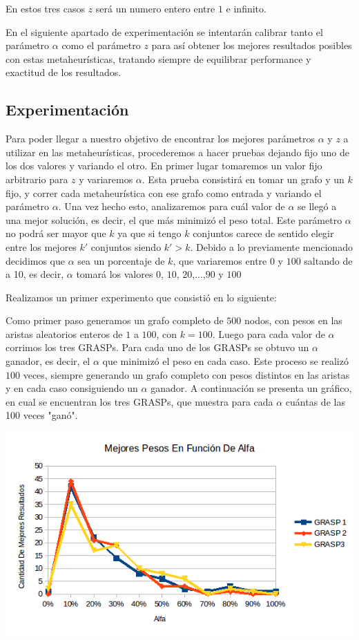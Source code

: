 En estos tres casos $z$ será un numero entero entre $1$ e infinito.

En el siguiente apartado de experimentación se intentarán calibrar tanto el parámetro $\alpha$ como el parámetro $z$ para así obtener los mejores resultados posibles con estas metaheurísticas, tratando siempre de equilibrar performance y exactitud de los resultados.

\subsection{Experimentación}

Para poder llegar a nuestro objetivo de encontrar los mejores parámetros $\alpha$ y $z$ a utilizar en las metaheurísticas, procederemos a hacer pruebas dejando fijo uno de los dos valores y variando el otro.
En primer lugar tomaremos un valor fijo arbitrario para $z$ y variaremos $\alpha$. Esta prueba consistirá en tomar un grafo y un $k$ fijo, y correr cada metaheurística con ese grafo como entrada y variando el parámetro $\alpha$. Una vez hecho esto, analizaremos para cuál valor de $\alpha$ se llegó a una mejor solución, es decir, el que más minimizó el peso total. Este parámetro $\alpha$ no podrá ser mayor que $k$ ya que si tengo $k$ conjuntos carece de sentido elegir entre los mejores $k'$ conjuntos siendo $k'>k$. Debido a lo previamente mencionado decidimos que $\alpha$ sea un porcentaje de $k$, que variaremos entre $0$ y $100$ saltando de a 10, es decir, $\alpha$ tomará los valores $0$, $10$, $20$,...,$90$ y $100$ 

Realizamos un primer experimento que consistió en lo siguiente:

Como primer paso generamos un grafo completo de $500$ nodos, con pesos en las aristas aleatorios enteros de $1$ a $100$, con $k=100$. Luego para cada valor de $\alpha$ corrimos los tres GRASPs. Para cada uno de los GRASPs se obtuvo un $\alpha$ ganador, es decir, el $\alpha$ que minimizó el peso en cada caso. Este proceso se realizó $100$ veces, siempre generando un grafo completo con pesos distintos en las aristas y en cada caso consiguiendo un $\alpha$ ganador. A continuación se presenta un gráfico, en cual se encuentran los tres GRASPs, que muestra para cada $\alpha$ cuántas de las 100 veces "ganó". 

\includegraphics[scale=0.7]{Ej5/respuestasAlfa1.png}\\

